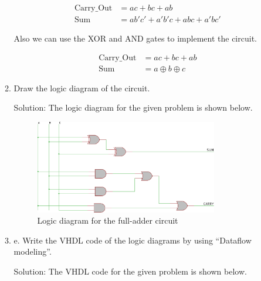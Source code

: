 \documentclass[table]{article}
\begin{document}
\begin{enumerate}
\begin{enumerate}
        \begin{align}
            \text{Carry\_Out} &= ac + bc + ab \\
            \text{Sum} &= ab'c' + a'b'c + abc + a'bc'
        \end{align}
    
        Also we can use the XOR and AND gates to implement the circuit.
    
        \begin{align}
            \text{Carry\_Out} &= ac + bc + ab \\
            \text{Sum} &= a \oplus b \oplus c
        \end{align}
    
        \item Draw the logic diagram of the circuit.
        
        Solution: The logic diagram for the given problem is shown below. 
    
        \begin{figure}[H]
            
            \centering
            \includegraphics[width=0.8\textwidth]{g4.pdf}
            \caption{Logic diagram for the full-adder circuit}
            \label{fig:fullAdder}
        \end{figure}
    
        \item e. Write the VHDL code of the logic diagrams by using “Dataflow modeling”.
        
        Solution: The VHDL code for the given problem is shown below.

        
        \begin{center} %
            \lstset{
          caption= full\_adder.vhd, 
          basicstyle=\footnotesize, frame=tb,
          xleftmargin=.2\textwidth, xrightmargin=.2\textwidth
        }
            
        

\end{center}
\end{enumerate}
\end{enumerate}
\end{document}
